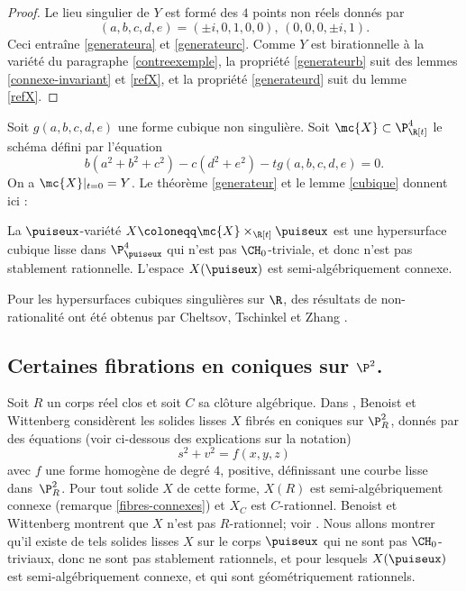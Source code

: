 \begin{proof}
Le lieu singulier de $Y$ est formé des $4$ points non réels donnés par
\[
(a,b,c,d,e) = (\pm i, 0,1,0,0),\, (0,0,0, \pm i, 1).
\]
Ceci entraîne \eqref{generateura} et \eqref{generateurc}. Comme $Y$ est birationnelle à la variété du paragraphe \ref{contreexemple}, la propriété \eqref{generateurb} suit des lemmes \ref{connexe-invariant} et \ref{refX}, et la propriété \eqref{generateurd} suit du lemme \ref{refX}.
\end{proof}

Soit $g(a,b,c,d,e)$ une forme cubique non singulière. Soit $\mc{X} \subset \P^4_{\R[t]}$ le schéma défini par l'équation
\[
b(a^2+b^2+c^2) - c(d^2+e^2) -tg(a,b,c,d,e)=0.
\]
On a $\mc{X}|_{t=0}=Y$. Le théorème \ref{generateur} et le lemme \ref{cubique} donnent ici :

\begin{thm}\label{prop-cubique}
La $\puiseux$-variété $X\coloneqq \mc{X}\times_{\R[t]} \puiseux$ est une hypersurface cubique lisse dans $\P^4_{\puiseux}$ qui n'est pas $\CH_0$-triviale, et donc n'est pas
stablement rationnelle. L'espace $X(\puiseux)$ est semi-algébriquement connexe.
\end{thm}

\begin{rmk}
Pour les hypersurfaces cubiques singulières sur $\R$, des résultats de non-rationalité ont été obtenus par Cheltsov, Tschinkel et Zhang \cite{cheltsov2024rationality}.
\end{rmk}

\subsection{Certaines fibrations en coniques sur \texorpdfstring{$\P^2$}{P2}.}

Soit $R$ un corps réel clos et soit $C$ sa clôture algébrique. Dans \cite{benoist2020clemens}, Benoist et Wittenberg considèrent les solides lisses $X$ fibrés en coniques sur
$\P^2_R$, donnés par des équations (voir ci-dessous des explications sur la notation)
\[
s^2+v^2=f(x,y,z)
\]
avec $f$ une forme homogène de degré $4$, positive,
définissant une courbe lisse dans~$\P^2_R$. Pour tout solide $X$ de cette forme, $X(R)$ est semi-algébriquement connexe (\cf remarque \ref{fibres-connexes}) et $X_C$ est $C$-rationnel. Benoist et Wittenberg montrent que $X$ n'est pas $R$-rationnel; voir \cite[Cor.\,3.6]{benoist2020clemens}. Nous allons montrer qu'il existe de tels solides lisses $X$ sur le corps $\puiseux$ qui ne sont pas $\CH_0$-triviaux, donc ne sont pas stablement rationnels, et pour lesquels $X(\puiseux)$ est semi-algébriquement connexe, et qui sont géométriquement rationnels.

